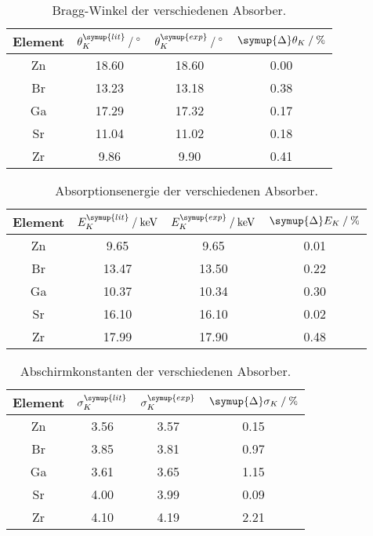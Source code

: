 \begin{table}[H]
  \centering
  \caption{Bragg-Winkel der verschiedenen Absorber.}
  \label{tab:theta_K}
  \begin{tabular}{c S S S}
    \toprule
    {Element} & {$\theta_{K}^{\symup{lit}} \mathbin{/} \unit{\degree}$} & %
    {$\theta_{K}^{\symup{exp}}  \mathbin{/} \unit{\degree}$} & %
    {$\symup{\Delta}\theta_{K} \mathbin{/} \unit{\percent}$}\\
    \midrule
    Zn & 18.60 & 18.60 & 0.00 \\
    Br & 13.23 & 13.18 & 0.38 \\
    Ga & 17.29 & 17.32 & 0.17 \\
    Sr & 11.04 & 11.02 & 0.18 \\
    Zr &  9.86 &  9.90 & 0.41 \\
    \bottomrule
  \end{tabular}
\end{table}

\begin{table}[H]
  \centering
  \caption{Absorptionsenergie der verschiedenen Absorber.}
  \label{tab:E_K}
  \begin{tabular}{c S S S}
    \toprule
    {Element} & {$E_{K}^{\symup{lit}} \mathbin{/} \unit{\kilo\electronvolt}$} & %
    {$E_{K}^{\symup{exp}}  \mathbin{/} \unit{\kilo\electronvolt}$} & %
    {$\symup{\Delta}E_{K} \mathbin{/} \unit{\percent}$}\\
    \midrule
    Zn &  9.65 &  9.65 & 0.01 \\
    Br & 13.47 & 13.50 & 0.22 \\
    Ga & 10.37 & 10.34 & 0.30 \\
    Sr & 16.10 & 16.10 & 0.02 \\
    Zr & 17.99 & 17.90 & 0.48 \\
    \bottomrule
  \end{tabular}
\end{table}

\begin{table}[H]
  \centering
  \caption{Abschirmkonstanten der verschiedenen Absorber.}
  \label{tab:sigma_K}
  \begin{tabular}{c S S S}
    \toprule
    {Element} & {$\sigma_{K}^{\symup{lit}}$} & %
    {$\sigma_{K}^{\symup{exp}}$} & %
    {$\symup{\Delta}\sigma_{K} \mathbin{/} \unit{\percent}$}\\
    \midrule
    Zn & 3.56 & 3.57 & 0.15 \\
    Br & 3.85 & 3.81 & 0.97 \\
    Ga & 3.61 & 3.65 & 1.15 \\
    Sr & 4.00 & 3.99 & 0.09 \\
    Zr & 4.10 & 4.19 & 2.21 \\
    \bottomrule
  \end{tabular}
\end{table}

